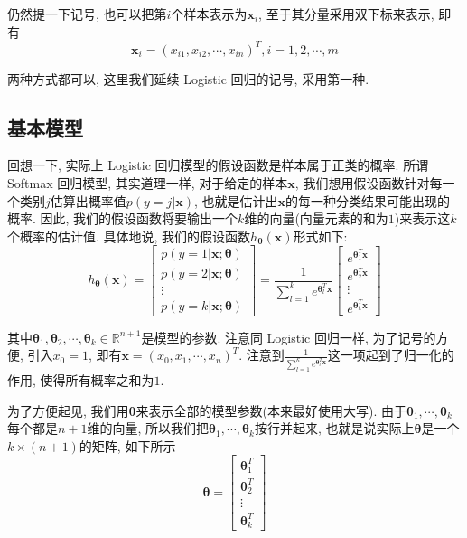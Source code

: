 \documentclass[a4paper,UTF8]{ctexart}
\theoremstyle{plain} \newtheorem{theorem}{定理}[section]
\theoremstyle{plain} \newtheorem{definition}{定义}[section]
\theoremstyle{plain} \newtheorem{lemma}{引理}[section]
\theoremstyle{plain} \newtheorem{proposition}{命题}[section]
\theoremstyle{plain} \newtheorem{example}{例}[section]
\theoremstyle{plain} \newtheorem{remark}{注}[section]
\theoremstyle{plain} \newtheorem{corollary}{推论}[section]
\begin{document}
仍然提一下记号, 也可以把第$i$个样本表示为$\bm{x}_{i}$, 至于其分量采用双下标来表示, 即有
\begin{equation*}
\bm{x}_{i} = (x_{i1}, x_{i2}, \cdots, x_{in})^{T},i = 1,2,\cdots,m
\end{equation*}

两种方式都可以, 这里我们延续 Logistic 回归的记号, 采用第一种.

\subsection{基本模型}
回想一下, 实际上 Logistic 回归模型的假设函数是样本属于正类的概率. 所谓 Softmax 回归模型, 其实道理一样, 对于给定的样本$\bm{x}$, 我们想用假设函数针对每一个类别$j$估算出概率值$p(y = j | \bm{x})$, 也就是估计出$\bm{x}$的每一种分类结果可能出现的概率. 因此, 我们的假设函数将要输出一个$k$维的向量(向量元素的和为$1$)来表示这$k$个概率的估计值. 具体地说, 我们的假设函数$h_{\bm{\theta}}(\bm{x})$形式如下:
$$
h_{\bm{\theta}}(\bm{x}) = 
\begin{bmatrix}
p(y = 1 | \bm{x}; \bm{\theta}) \\ 
p(y = 2 | \bm{x}; \bm{\theta}) \\ 
\vdots \\ 
p(y = k | \bm{x}; \bm{\theta})
\end{bmatrix}
= \frac{1}{\sum_{l=1}^{k} e^{\bm{\theta}_{l}^T \bm{x}}}
\begin{bmatrix}
e^{\bm{\theta}_{1}^T \bm{x}} \\ 
e^{\bm{\theta}_{2}^T \bm{x}} \\ 
\vdots \\ 
e^{\bm{\theta}_{k}^T \bm{x}}
\end{bmatrix}
$$

其中$\bm{\theta}_1, \bm{\theta}_2, \cdots, \bm{\theta}_k \in \mathbb{R}^{n+1}$是模型的参数. 注意同 Logistic 回归一样, 为了记号的方便, 引入$x_{0} = 1$, 即有$\bm{x} = (x_{0}, x_{1}, \cdots, x_{n})^{T}$. 注意到$\frac{1}{\sum_{l=1}^{k} e^{\bm{\theta}_l^T \bm{x}}}$这一项起到了归一化的作用, 使得所有概率之和为$1$.

为了方便起见, 我们用$\bm{\theta}$来表示全部的模型参数(本来最好使用大写). 由于$\bm{\theta}_1, \cdots, \bm{\theta}_k$每个都是$n+1$维的向量, 所以我们把$\bm{\theta}_1, \cdots, \bm{\theta}_k$按行并起来, 也就是说实际上$\bm{\theta}$是一个$k \times (n+1)$的矩阵, 如下所示
$$
\bm{\theta} = 
\begin{bmatrix}
\bm{\theta}_{1}^{T} \\ 
\bm{\theta}_{2}^{T} \\ 
\vdots \\ 
\bm{\theta}_{k}^{T}
\end{bmatrix}
$$
\end{document}
